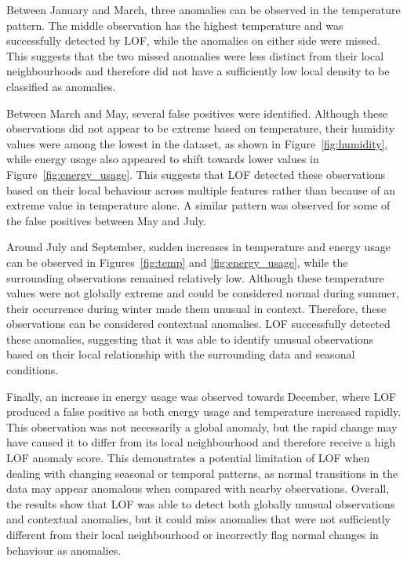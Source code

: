 \documentclass[a4paper,12pt]{article}
\begin{document}
Between January and March, three anomalies can be observed in the temperature pattern. The middle observation has the highest temperature and was successfully detected by LOF, while the anomalies on either side were missed. This suggests that the two missed anomalies were less distinct from their local neighbourhoods and therefore did not have a sufficiently low local density to be classified as anomalies.

Between March and May, several false positives were identified. Although these observations did not appear to be extreme based on temperature, their humidity values were among the lowest in the dataset, as shown in Figure~\ref{fig:humidity}, while energy usage also appeared to shift towards lower values in Figure~\ref{fig:energy_usage}. This suggests that LOF detected these observations based on their local behaviour across multiple features rather than because of an extreme value in temperature alone. A similar pattern was observed for some of the false positives between May and July.

Around July and September, sudden increases in temperature and energy usage can be observed in Figures~\ref{fig:temp} and \ref{fig:energy_usage}, while the surrounding observations remained relatively low. Although these temperature values were not globally extreme and could be considered normal during summer, their occurrence during winter made them unusual in context. Therefore, these observations can be considered contextual anomalies. LOF successfully detected these anomalies, suggesting that it was able to identify unusual observations based on their local relationship with the surrounding data and seasonal conditions.

Finally, an increase in energy usage was observed towards December, where LOF produced a false positive as both energy usage and temperature increased rapidly. This observation was not necessarily a global anomaly, but the rapid change may have caused it to differ from its local neighbourhood and therefore receive a high LOF anomaly score. This demonstrates a potential limitation of LOF when dealing with changing seasonal or temporal patterns, as normal transitions in the data may appear anomalous when compared with nearby observations. Overall, the results show that LOF was able to detect both globally unusual observations and contextual anomalies, but it could miss anomalies that were not sufficiently different from their local neighbourhood or incorrectly flag normal changes in behaviour as anomalies.
\end{document}
